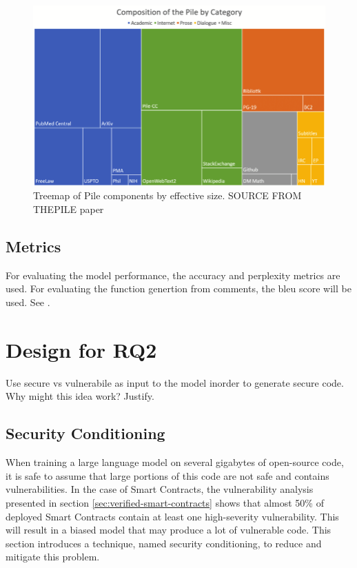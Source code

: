 \begin{figure}[htp]
    \centering
    \includegraphics[width=\textwidth]{figures/Treemap-of-Pile-components-by-effective-size.png}
    \caption{Treemap of Pile components by effective size. SOURCE FROM THEPILE paper}
    \label{fig:flowchart}
\end{figure}

\subsection{Metrics}
For evaluating the model performance, the accuracy and perplexity metrics are used. For evaluating the function  genertion from comments, the bleu score will be used. See \label{sec:rq1-evaluation-metrics}.

\section{Design for RQ2}
\label{sec:design-for-rq2}
Use secure vs vulnerabile as input to the  model inorder to generate secure code. 
Why might this idea work? Justify.

\subsection{Security Conditioning}
\label{sec:security-conditioning}
When training a large language model on several gigabytes of open-source code, it is safe to assume that large portions of this code are not safe and contains vulnerabilities. In the case of Smart Contracts, the vulnerability analysis presented in section \ref{sec:verified-smart-contracts} shows that almost 50\% of deployed Smart Contracts contain at least one high-severity vulnerability. This will result in a biased model that may produce a lot of vulnerable code. This section introduces a technique, named security conditioning, to reduce and mitigate this problem.

